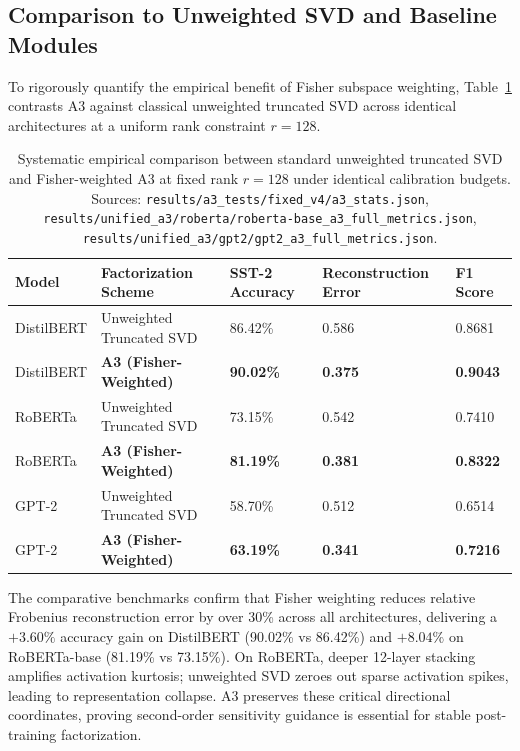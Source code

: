 \subsection{Comparison to Unweighted SVD and Baseline Modules}
\label{sec:svd_comparison}

To rigorously quantify the empirical benefit of Fisher subspace weighting, Table~\ref{tab:svd_vs_a3} contrasts A3 against classical unweighted truncated SVD across identical architectures at a uniform rank constraint $r = 128$.

\begin{table}[H]
\centering
\small
\begin{tabular}{lllll}
\toprule
\textbf{Model} & \textbf{Factorization Scheme} & \textbf{SST-2 Accuracy} & \textbf{Reconstruction Error} & \textbf{F1 Score} \\
\midrule
DistilBERT & Unweighted Truncated SVD & 86.42\% & 0.586 & 0.8681 \\
DistilBERT & \textbf{A3 (Fisher-Weighted)} & \textbf{90.02\%} & \textbf{0.375} & \textbf{0.9043} \\
RoBERTa & Unweighted Truncated SVD & 73.15\% & 0.542 & 0.7410 \\
RoBERTa & \textbf{A3 (Fisher-Weighted)} & \textbf{81.19\%} & \textbf{0.381} & \textbf{0.8322} \\
GPT-2 & Unweighted Truncated SVD & 58.70\% & 0.512 & 0.6514 \\
GPT-2 & \textbf{A3 (Fisher-Weighted)} & \textbf{63.19\%} & \textbf{0.341} & \textbf{0.7216} \\
\bottomrule
\end{tabular}
\caption{Systematic empirical comparison between standard unweighted truncated SVD and Fisher-weighted A3 at fixed rank $r=128$ under identical calibration budgets. Sources: \texttt{results/a3\_tests/fixed\_v4/a3\_stats.json}, \texttt{results/unified\_a3/roberta/roberta-base\_a3\_full\_metrics.json}, \texttt{results/unified\_a3/gpt2/gpt2\_a3\_full\_metrics.json}.}
\label{tab:svd_vs_a3}
\end{table}

The comparative benchmarks confirm that Fisher weighting reduces relative Frobenius reconstruction error by over 30\% across all architectures, delivering a $+3.60\%$ accuracy gain on DistilBERT (90.02\% vs 86.42\%) and $+8.04\%$ on RoBERTa-base (81.19\% vs 73.15\%). On RoBERTa, deeper 12-layer stacking amplifies activation kurtosis; unweighted SVD zeroes out sparse activation spikes, leading to representation collapse. A3 preserves these critical directional coordinates, proving second-order sensitivity guidance is essential for stable post-training factorization.

